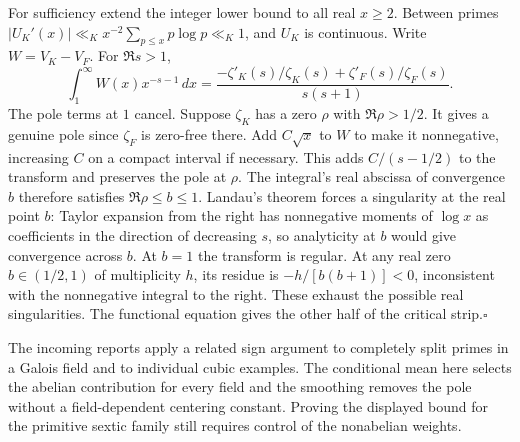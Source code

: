For sufficiency extend the integer lower bound to all real $x\ge2$.
Between primes $|U_K'(x)|\ll_K x^{-2}\sum_{p\le x}p\log p\ll_K 1$,
and $U_K$ is continuous. Write $W=V_K-V_F$. For $\Re s>1$,
\[
 \int_1^\infty W(x)x^{-s-1}\,dx
 =\frac{-\zeta'_K(s)/\zeta_K(s)+\zeta'_F(s)/\zeta_F(s)}{s(s+1)} .
\]
The pole terms at $1$ cancel. Suppose $\zeta_K$ has a zero $\rho$ with
$\Re\rho>1/2$. It gives a genuine pole since $\zeta_F$ is zero-free there.
Add $C\sqrt x$ to $W$ to make it nonnegative, increasing $C$ on a compact
interval if necessary. This adds $C/(s-1/2)$ to the transform and preserves
the pole at $\rho$. The integral's real abscissa of convergence $b$
therefore satisfies $\Re\rho\le b\le1$. Landau's theorem forces a
singularity at the real point $b$: Taylor expansion from the right has
nonnegative moments of $\log x$ as coefficients in the direction of
decreasing $s$, so analyticity at $b$ would give convergence across $b$.
At $b=1$ the transform is regular. At any real zero $b\in(1/2,1)$ of
multiplicity $h$, its residue is $-h/[b(b+1)]<0$, inconsistent with the
nonnegative integral to the right. These exhaust the possible real
singularities. The functional equation gives the other half of the
critical strip.\hfill$\square$

The incoming reports apply a related sign argument to completely split
primes in a Galois field and to individual cubic examples. The conditional
mean here selects the abelian contribution for every field and the smoothing
removes the pole without a field-dependent centering constant. Proving the
displayed bound for the primitive sextic family still requires control of
the nonabelian weights.
